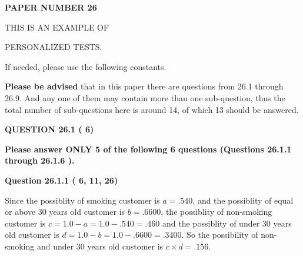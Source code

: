 \documentclass[12pt]{article}
\begin{document}
 
 
   
   
\newpage 
\setcounter{page}{ 
    26001 } 
   
   
   
   
 {\textbf{ \Large{ PAPER NUMBER          26 }}}
   
   
\vspace{0.2in}
   
   
   
   
   
   
 \vspace{0.2in}
 
 
{\Huge  THIS IS AN EXAMPLE OF}
 
{\Huge  PERSONALIZED TESTS. }
 
If needed, please use the following constants.
 
 
 
{\textbf{\large{Please be advised}}} that in this paper there are questions from
26.1 through
26.9.
And any one of them may contain more than one sub-question, thus the total number
of sub-questions here is around 14, of which
13 should be answered.
 
\vspace{0.3in}
 
 
   
   
  
\vspace{0.2in}
  
{\textbf{\Large{QUESTION
26.1 
 (          6)
}}}
  
  
{\textbf{\Large{Please answer ONLY  %
           5 %
 of the following  %
           6 %
 questions (Questions  %
26.1.1 %
 through  %
26.1.6 %
 ). }}}
   
   
  
\vspace{0.2in}
  
{\textbf{\Large{Question
26.1.1 
 (          6,         11,         26)
}}}
  
  
 
 

Since the possiblity of  %
smoking customer is $ a =  %
.540 $,
and the possiblity of  %
equal or above 30 years old customer is $ b =  %
.6600 $,
the possiblity of  %
non-smoking customer is $ c = 1.0 - a = 1.0 -
.540
=  %
.460 $ and the possiblity of  %
under 30 years old
customer is $ d = 1.0 - b = 1.0 -  %
.6600 =  %
.3400  $.
So the possibility of  %
 non-smoking and  %
under 30 years old
customer is $ c \times d =  %
.156 $.
 
\end{document}
